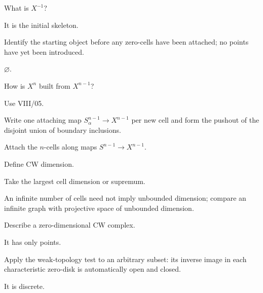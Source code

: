 \begin{exercise}\label{exr:viii06-03}
What is \(X^{-1}\)?
\end{exercise}
\begin{hint}
It is the initial skeleton.

Identify the starting object before any zero-cells have been attached; no points have yet been introduced.
\end{hint}
\begin{solution}
\(\varnothing\).
\end{solution}

\begin{exercise}\label{exr:viii06-04}
How is \(X^n\) built from \(X^{n-1}\)?
\end{exercise}
\begin{hint}
Use VIII/05.

Write one attaching map \(S^{n-1}_\alpha\to X^{n-1}\) per new cell and form the pushout of the disjoint union of boundary inclusions.
\end{hint}
\begin{solution}
Attach the \(n\)-cells along maps \(S^{n-1}\to X^{n-1}\).
\end{solution}

\begin{exercise}\label{exr:viii06-05}
Define CW dimension.
\end{exercise}
\begin{hint}
Take the largest cell dimension or supremum.

An infinite number of cells need not imply unbounded dimension; compare an infinite graph with projective space of unbounded dimension.
\end{hint}

\begin{exercise}\label{exr:viii06-06}
Describe a zero-dimensional CW complex.
\end{exercise}
\begin{hint}
It has only points.

Apply the weak-topology test to an arbitrary subset: its inverse image in each characteristic zero-disk is automatically open and closed.
\end{hint}
\begin{solution}
It is discrete.
\end{solution}


